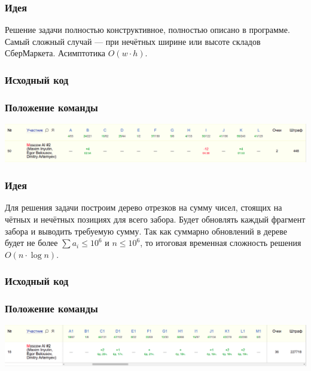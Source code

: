 
\subsubsection*{Идея}
Решение задачи полностью конструктивное, полностью описано в программе. Самый сложный случай --- при нечётных ширине или высоте складов СберМаркета. Асимптотика $O(w \cdot h)$.
\subsubsection*{Исходный код}

\subsubsection*{Положение команды}
\includegraphics[scale=0.25]{images/rucode.png}\newline\noindent
\pagebreak


\subsubsection*{Идея}
Для решения задачи построим дерево отрезков на сумму чисел, стоящих на чётных и нечётных позициях для всего забора. Будет обновлять каждый фрагмент забора и выводить требуемую сумму. Так как суммарно обновлений в дереве будет не более $\sum a_i \leqslant 10 ^ 6$ и $n \leqslant 10 ^ 6$, то итоговая временная сложность решения $O(n \cdot \log{n})$.
\subsubsection*{Исходный код}

\subsubsection*{Положение команды}
\includegraphics[scale=0.25]{images/mw1.png}\newline\noindent
\pagebreak

